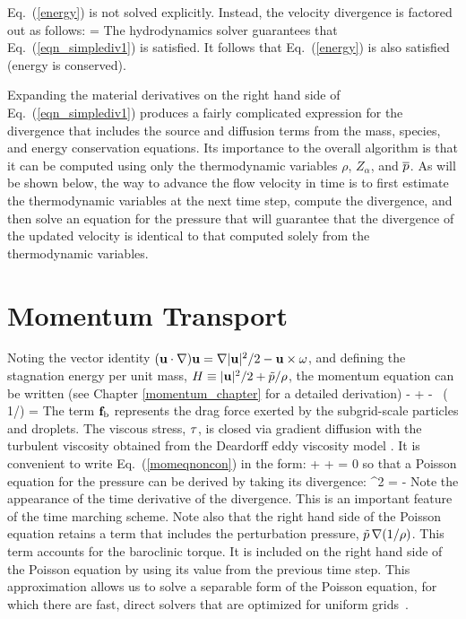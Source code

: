 Eq.~(\ref{energy}) is not solved explicitly. Instead, the velocity divergence is factored out as follows:
\be
\label{eqn_simplediv1}
\Div{} =  
\ee
The hydrodynamics solver guarantees that Eq.~(\ref{eqn_simplediv1}) is satisfied.  It follows that Eq.~(\ref{energy}) is also satisfied (energy is conserved).

Expanding the material derivatives on the right hand side of Eq.~(\ref{eqn_simplediv1}) produces a fairly complicated expression for
the divergence that includes the source and diffusion terms from the mass, species, and energy conservation equations. Its importance to the overall algorithm is that it can be computed using only the thermodynamic variables $\rho$, $Z_\alpha$, and $\overline{p}$. As will be shown below, the way to advance the flow velocity in time is to first estimate the thermodynamic variables at the next time step, compute the divergence, and then solve an equation for the pressure that will guarantee that the divergence of the updated velocity is identical to that computed solely from the thermodynamic variables.



\section{Momentum Transport}

Noting the vector identity $({\mathbf{u}} \cdot \nabla) {\mathbf{u}} = \nabla|{\mathbf{u}}|^2/2 - {\mathbf{u}}\times{\mathbf{\omega}} $, and defining the stagnation energy per unit mass, $H \equiv |{\mathbf{u}}|^2/2 + \tilde{p}/\rho$, the momentum equation can be written (see Chapter \ref{momentum_chapter} for a detailed derivation)
\be
    - \bu\times\bo + \nabla \cH - \tp \, \nabla \left( 1/\rho\right) =   \label{momeqnoncon}
\ee
The term ${\mathbf{f}}_\text{b}$ represents the drag force exerted by the subgrid-scale particles and droplets. The viscous stress, $\mathbf{\tau}$, is closed via gradient diffusion with the turbulent viscosity obtained from the Deardorff eddy viscosity model \cite{Deardorff:1980,Pope:2000}. It is convenient to write Eq.~(\ref{momeqnoncon}) in the form:
\be 
    + \bF + \nabla \cH = 0  
\ee
so that a Poisson equation for the pressure can be derived by taking its divergence:
\be 
   \nabla^2 \cH = -    \label{simplephi2} 
\ee
Note the appearance of the time derivative of the divergence. This is an important feature of the time marching scheme. Note also that the right hand side of the Poisson equation retains a term that includes the perturbation pressure, $\tilde{p} \, \nabla (1/\rho)$. This term accounts for the baroclinic torque. It is included on the right hand side of the Poisson equation by using its value from the previous time step. This approximation allows us to solve a separable form of the Poisson equation, for which there are fast, direct solvers that are optimized for uniform grids~\cite{Sweet:1}.

